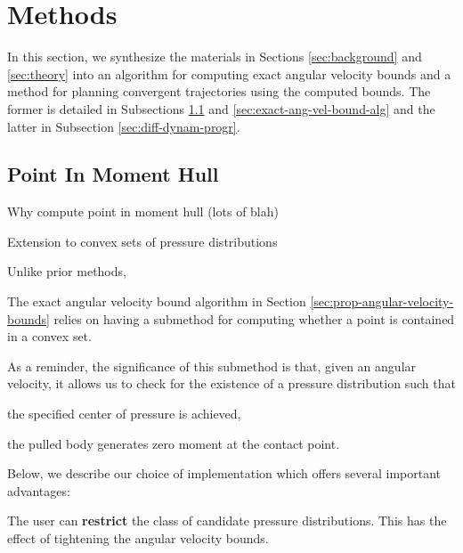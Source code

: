 \documentclass[conference]{IEEEtran}
\begin{document}
\section{Methods}

In this section, we synthesize the materials in Sections
\ref{sec:background} and \ref{sec:theory} into an algorithm for
computing exact angular velocity bounds and a method for planning
convergent trajectories using the computed bounds. The former is
detailed in Subsections \ref{sec:point-in-moment-hull} and
\ref{sec:exact-ang-vel-bound-alg} and the latter in Subsection
\ref{sec:diff-dynam-progr}.



\subsection{Point In Moment Hull}\label{sec:point-in-moment-hull}

\begin{inparaenum}
\item Why compute point in moment hull (lots of blah)
\item Extension to convex sets of pressure distributions
\end{inparaenum}

Unlike prior methods, 

\begin{inparaenum}
\item The exact angular velocity bound algorithm in Section
  \ref{sec:prop-angular-velocity-bounds} relies on having a submethod
  for computing whether a point is contained in a convex set.
\item As a reminder, the significance of this submethod is that, given
  an angular velocity, it allows us to check for the existence of a
  pressure distribution such that
  \begin{inparaenum}
  \item the specified center of pressure is achieved,
  \item the pulled body generates zero moment at the contact point.
  \end{inparaenum}
\item Below, we describe our choice of implementation which offers
  several important advantages:
  \begin{inparaenum}
  \item The user can \textbf{restrict} the class of candidate pressure
    distributions. This has the effect of tightening the angular
    velocity bounds.
  \end{inparaenum}
\end{inparaenum}
\end{document}
